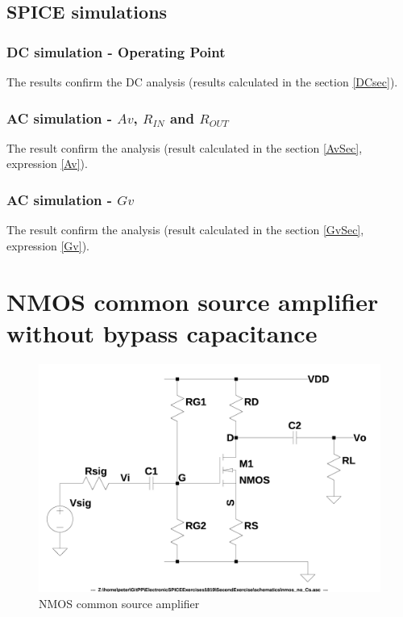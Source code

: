 \documentclass[10pt,a4paper]{book}
\begin{document}
\clearpage
\section{SPICE simulations}
\subsection{DC simulation - Operating Point}\label{DCsim}

The results confirm the DC analysis (results calculated in the section \ref{DCsec}).


\subsection{AC simulation - $Av$, $R_{IN}$ and $R_{OUT}$}

The result confirm the analysis (result calculated in the section \ref{AvSec}, expression \ref{Av}).


\subsection{AC simulation - $Gv$}

The result confirm the analysis (result calculated in the section \ref{GvSec}, expression \ref{Gv}).


\chapter{NMOS common source amplifier without bypass capacitance}
\begin{figure}[h]
  \centering
  \includegraphics[width=12cm]{schematics/nmos_no_Cs.jpg}
  \caption{NMOS common source amplifier}
  \label{nmos_no_Cs}
\end{figure}
\end{document}
